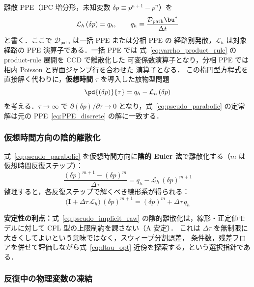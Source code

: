 離散 PPE（IPC 増分形，未知変数 $\delta p \equiv p^{n+1}-p^n$）を
\begin{equation}
  \mathcal{L}_h\,(\delta p) = q_h,
  \qquad
  q_h \equiv \frac{\mathcal{D}_{\mathrm{path}}\bu^*}{\Delta t}
  \label{eq:PPE_discrete}
\end{equation}
と書く．ここで $\mathcal{D}_{\mathrm{path}}$ は一括 PPE または分相 PPE の
経路別発散，$\mathcal{L}_h$ は対象経路の PPE 演算子である．一括 PPE では
式~\eqref{eq:varrho_product_rule} の product-rule 展開を CCD で離散化した
可変係数演算子となり，分相 PPE では相内 Poisson と界面ジャンプ行を合わせた
演算子となる．
この楕円型方程式を直接解く代わりに，\textbf{仮想時間} $\tau$ を導入した放物型問題
\begin{equation}
  \pd{(\delta p)}{\tau} = q_h - \mathcal{L}_h\,(\delta p)
  \label{eq:pseudo_parabolic}
\end{equation}
を考える．$\tau\to\infty$ で $\partial(\delta p)/\partial\tau \to 0$ となり，式~\eqref{eq:pseudo_parabolic} の定常解は元の PPE~\eqref{eq:PPE_discrete} の解に一致する．

\subsubsection{仮想時間方向の陰的離散化}
\label{sec:pseudo_implicit}

式~\eqref{eq:pseudo_parabolic} を仮想時間方向に\textbf{陰的 Euler 法}で離散化する（$m$ は仮想時間反復ステップ）：
\begin{equation}
  \frac{(\delta p)^{m+1} - (\delta p)^m}{\Delta\tau} = q_h - \mathcal{L}_h\,(\delta p)^{m+1}
  \label{eq:pseudo_implicit_raw}
\end{equation}
整理すると，各反復ステップで解くべき線形系が得られる：
\begin{equation}
  \bigl(\mathbf{I} + \Delta\tau\,\mathcal{L}_h\bigr)\,(\delta p)^{m+1}
  = (\delta p)^m + \Delta\tau\, q_h
  \label{eq:pseudo_linear}
\end{equation}

\textbf{安定性の利点：}式~\eqref{eq:pseudo_implicit_raw} の陰的離散化は，線形・正定値モデルに対して
CFL 型の上限制約を課さない（A 安定）．
これは $\Delta\tau$ を無制限に大きくしてよいという意味ではなく，スウィープ分割誤差，
条件数，残差フロアを併せて評価しながら式~\eqref{eq:dtau_opt} 近傍を探索する，という選択指針である．

\subsubsection{反復中の物理変数の凍結}
\label{sec:pseudo_variable_freeze}

